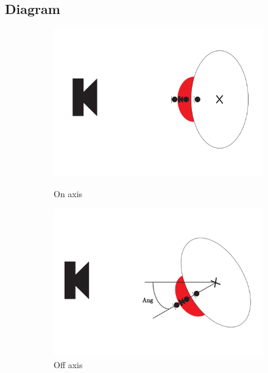\subsection{Diagram}
\begin{figure}[H]
	\centering
	\begin{subfigure}[b]{.4\textwidth}
		\includegraphics[width=\textwidth]{../Journal/Experiments/AngleOfIncidence/AngleOfIncidenceOnAxis.pdf}
		\caption{On axis}
		\label{fig:AngOgIndOnax}
		\vspace{2ex}
		\includegraphics[width=\textwidth]{../Journal/Experiments/AngleOfIncidence/AngleOfIncidenceOffAxis.pdf}
		\caption{Off axis}
		\label{fig:AngOgIndOffax}
	\end{subfigure} 
	\begin{subfigure}[b]{.4\textwidth}
	\centering

\end{subfigure}
\end{figure}
